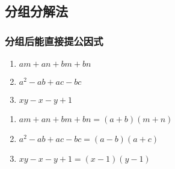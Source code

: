 \documentclass[cn,blue]{elegantbook}
\begin{document}
\subsection{分组分解法}%
\label{ssub:分组分解法}
\subsubsection{分组后能直接提公因式}%
\label{par:分组后能直接提公因式}
\begin{problem}
    \begin{enumerate}
        \item \(am+an+bm+bn\)
        \item \(a^2-ab+ac-bc\)
        \item \(xy-x-y+1\)
    \end{enumerate}
\end{problem}
\begin{solution}
\begin{enumerate}
    \item \(am+an+bm+bn=(a+b)(m+n)\)
    \item \(a^2-ab+ac-bc=(a-b)(a+c)\)
    \item \(xy-x-y+1=(x-1)(y-1)\)
\end{enumerate}
\end{solution}
\end{document}
